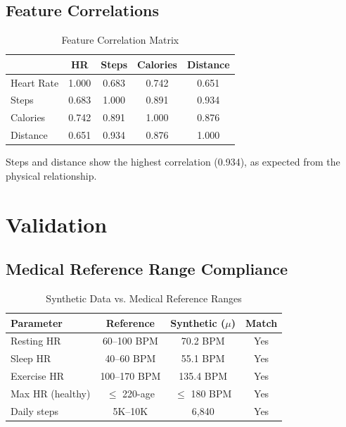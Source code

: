 \documentclass[conference]{IEEEtran}
\begin{document}
\subsection{Feature Correlations}

\begin{table}[H]
\centering
\caption{Feature Correlation Matrix}
\label{tab:correlations}
\begin{tabular}{lcccc}
\toprule
& \textbf{HR} & \textbf{Steps} & \textbf{Calories} & \textbf{Distance} \\
\midrule
Heart Rate & 1.000 & 0.683 & 0.742 & 0.651 \\
Steps & 0.683 & 1.000 & 0.891 & 0.934 \\
Calories & 0.742 & 0.891 & 1.000 & 0.876 \\
Distance & 0.651 & 0.934 & 0.876 & 1.000 \\
\bottomrule
\end{tabular}
\end{table}

Steps and distance show the highest correlation (0.934), as expected from the physical relationship.

\section{Validation}

\subsection{Medical Reference Range Compliance}

\begin{table}[H]
\centering
\caption{Synthetic Data vs. Medical Reference Ranges}
\label{tab:medical_validation}
\begin{tabular}{lccc}
\toprule
\textbf{Parameter} & \textbf{Reference} & \textbf{Synthetic ($\mu$)} & \textbf{Match} \\
\midrule
Resting HR & 60--100 BPM & 70.2 BPM & Yes \\
Sleep HR & 40--60 BPM & 55.1 BPM & Yes \\
Exercise HR & 100--170 BPM & 135.4 BPM & Yes \\
Max HR (healthy) & $\leq$ 220-age & $\leq$ 180 BPM & Yes \\
Daily steps & 5K--10K & 6,840 & Yes \\
\bottomrule
\end{tabular}
\end{table}
\end{document}

